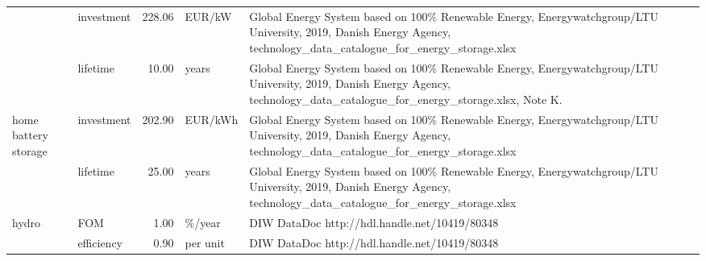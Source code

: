 \begin{longtable}{p{5cm}p{3cm}rp{3cm}p{11cm}}
                      & investment &         228.06 &                            EUR/kW &                                                                                                                                                                  Global Energy System based on 100\% Renewable Energy, Energywatchgroup/LTU University, 2019, Danish Energy Agency, technology\_data\_catalogue\_for\_energy\_storage.xlsx \\
                      & lifetime &          10.00 &                             years &                                                                                                                                                         Global Energy System based on 100\% Renewable Energy, Energywatchgroup/LTU University, 2019, Danish Energy Agency, technology\_data\_catalogue\_for\_energy\_storage.xlsx, Note K. \\
home battery storage & investment &         202.90 &                           EUR/kWh &                                                                                                                                                                  Global Energy System based on 100\% Renewable Energy, Energywatchgroup/LTU University, 2019, Danish Energy Agency, technology\_data\_catalogue\_for\_energy\_storage.xlsx \\
                      & lifetime &          25.00 &                             years &                                                                                                                                                                  Global Energy System based on 100\% Renewable Energy, Energywatchgroup/LTU University, 2019, Danish Energy Agency, technology\_data\_catalogue\_for\_energy\_storage.xlsx \\
hydro & FOM &           1.00 &                            \%/year &                                                                                                                                                                                                                                                                                        DIW DataDoc http://hdl.handle.net/10419/80348 \\
                      & efficiency &           0.90 &                          per unit &                                                                                                                                                                                                                                                                                        DIW DataDoc http://hdl.handle.net/10419/80348 \\

\end{longtable}
